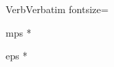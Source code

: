 


\usepackage {amsmath}      %
\usepackage {amssymb}
\usepackage {textcase}     %
\usepackage {indentfirst}  %
\usepackage {color}

\usepackage {fancyvrb}     %
\DefineVerbatimEnvironment%
	{Verb}{Verbatim}
	{fontsize=\small}

\usepackage {ifpdf}        %
\ifpdf
  \usepackage [pdftex] {graphicx}
  \DeclareGraphicsRule {*} {mps} {*} {}
\else
  \usepackage [draft] {graphicx}
  \DeclareGraphicsRule {*} {eps} {*} {}
\fi









\endinput


